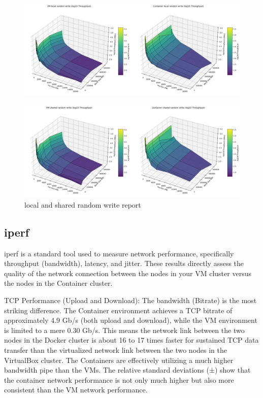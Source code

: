 \begin{figure}[H]
    \centering
    \includegraphics[width=\linewidth]{assets/VM local random write_Container local random write_log_surfaces.png}
        \end{figure}
\begin{figure}[H]
    \centering
    \includegraphics[width=\linewidth]{assets/VM shared random write_Container shared random write_log_surfaces.png}
    \caption{local and shared random write report}
    \label{fig:enter-label}
\end{figure}

\subsection{iperf}

iperf is a standard tool used to measure network performance, specifically throughput (bandwidth), latency, and jitter. These results directly assess the quality of the network connection between the nodes in your VM cluster versus the nodes in the Container cluster.

TCP Performance (Upload and Download): 
The bandwidth (Bitrate) is the most striking difference. The Container environment achieves a TCP bitrate of approximately 4.9 Gb/s (both upload and download), while the VM environment is limited to a mere 0.30 Gb/s. This means the network link between the two nodes in the Docker cluster is about 16 to 17 times faster for sustained TCP data transfer than the virtualized network link between the two nodes in the VirtualBox cluster. The Containers are effectively utilizing a much higher bandwidth pipe than the VMs. The relative standard deviations (±) show that the container network performance is not only much higher but also more consistent than the VM network performance.


